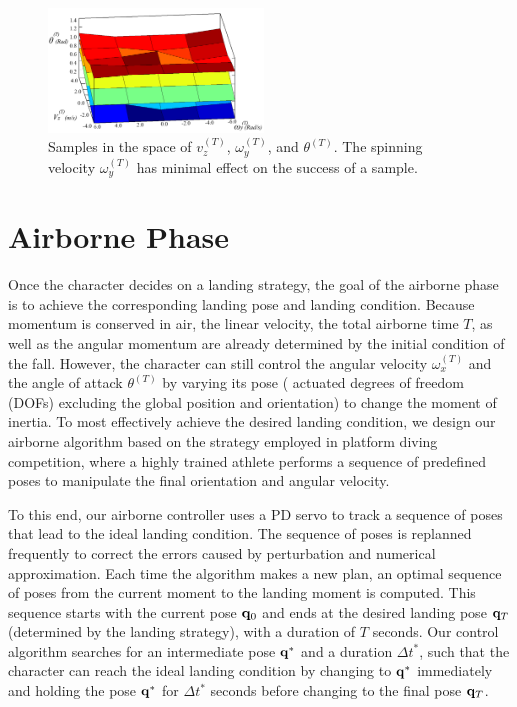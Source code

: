 \begin{figure}[ht]
\center
  \includegraphics[width=0.51\textwidth]{images/sampleWYflat}
  \caption{
    Samples in the space of $v_z^{(T)}$, $\omega_y^{(T)}$, and
    $\theta^{(T)}$. The spinning velocity $\omega_y^{(T)}$
    has minimal effect on the success of a sample.
  }
 \label{fig:landing_sampleNonPlanar}
\end{figure}


\section{Airborne Phase}
Once the character decides on a landing strategy, the goal of the
airborne phase is to achieve the corresponding landing pose and
landing condition. Because momentum is conserved in air, the linear
velocity, the total airborne time $T$, as well as the angular momentum
are already determined by the initial condition of the fall.  However,
the character can still control the angular velocity $\omega_x^{(T)}$
and the angle of attack $\theta^{(T)}$ by varying its pose (\ie
actuated degrees of freedom (DOFs) excluding the global position and
orientation) to change the moment of inertia. To most effectively
achieve the desired landing condition, we design our airborne
algorithm based on the strategy employed in platform diving
competition, where a highly trained athlete performs a sequence of
predefined poses to manipulate the final orientation and angular
velocity.

To this end, our airborne controller uses a PD servo to track a
sequence of poses that lead to the ideal landing condition. 
The sequence of poses is replanned frequently to correct the errors
caused by perturbation and numerical approximation. Each time the
algorithm makes a new plan, an optimal sequence of poses from the
current moment to the landing moment is computed. This sequence
starts with the current pose $\mathbf{q}_0$ and ends at the desired
landing pose $\mathbf{q}_T$ (determined by the landing strategy), with a
duration of $T$ seconds. Our control algorithm searches for an
intermediate pose $\mathbf{q}^*$ and a duration $\Delta t^*$, such that
the character can reach the ideal landing condition by changing to
$\mathbf{q}^*$ immediately and holding the pose $\mathbf{q}^*$ for $\Delta
t^*$ seconds before changing to the final pose $\mathbf{q}_T$.

